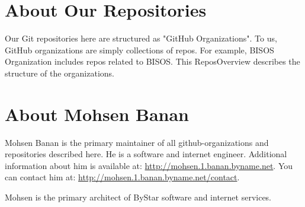 \section{About Our Repositories}

Our Git repositories here are structured as "GitHub Organizations". To
us, GitHub organizations are simply collections of repos. For example,
BISOS Organization includes repos related to BISOS. This ReposOverview
describes the structure of the organizations.

\begin{comment}
*  [[elisp:(org-cycle)][| ]] [[elisp:(org-show-subtree)][|=]] [[elisp:(show-children 10)][|V]] [[elisp:(bx:orgm:indirectBufOther)][|>]] [[elisp:(bx:orgm:indirectBufMain)][|I]] [[elisp:(blee:ppmm:org-mode-toggle)][|N]] [[elisp:(org-top-overview)][|O]] [[elisp:(progn (org-shifttab) (org-content))][|C]] [[elisp:(delete-other-windows)][|1]]  /Section/   About Mohsen Banan ::  [[elisp:(org-cycle)][| ]]
\end{comment}

\section{About Mohsen Banan}


Mohsen Banan is the primary maintainer of all github-organizations and
repositories described here. He is a software and internet engineer.
Additional information about him is available at: 
\url{http://mohsen.1.banan.byname.net}. You can contact him at:
\url{http://mohsen.1.banan.byname.net/contact}.

Mohsen is the primary architect of ByStar software and internet services.

\begin{comment}
*  [[elisp:(org-cycle)][| ]] [[elisp:(org-show-subtree)][|=]] [[elisp:(show-children 10)][|V]] [[elisp:(bx:orgm:indirectBufOther)][|>]] [[elisp:(bx:orgm:indirectBufMain)][|I]] [[elisp:(blee:ppmm:org-mode-toggle)][|N]] [[elisp:(org-top-overview)][|O]] [[elisp:(progn (org-shifttab) (org-content))][|C]] [[elisp:(delete-other-windows)][|1]]  /Section/   About ByStar: The Libre-Halaal ByStar Digital Ecosystem ::  [[elisp:(org-cycle)][| ]]
\end{comment}

